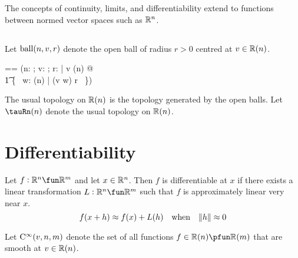 \documentclass[11pt, oneside]{article}
\begin{document}
The concepts of continuity, limits, and differentiability extend to functions between normed vector spaces such as $\mathbb{R}^n$.

\subsection{}

Let $\operatorname{ball}(n,v,r)$ denote the open ball of radius $r > 0$ centred at $v \in \mathbb{R}(n)$.

\begin{zed}
	\ballRn == (\lambda n: \nat; v: \Rinf; r: \Rpos | v \in \R(n) @ \\
	\t1	\{~ w: \Rtuples(n) | \normR(v \vsubR w) \ltR r ~\})
\end{zed}

The usual topology on $\mathbb{R}(n)$ is the topology generated by the open balls.
Let $\tauRn(n)$ denote the usual topology on $\mathbb{R}(n)$.

\section{Differentiability}

Let $f: \R^n \fun \R^m$ and let $x \in \mathbb{R}^n$.
Then $f$ is differentiable at $x$ if there exists a linear transformation $L: \R^n \fun \R^m$
such that $f$ is approximately linear very near $x$.
$$
f(x + h) \approx f(x) + L(h) \quad \text{when} \quad \norm{h} \approx 0
$$ 

Let $\operatorname{C^{\infty}}(v,n,m)$ denote the set of all functions $f \in \Rtuples(n) \pfun \Rtuples(m)$ that are smooth at $v \in \mathbb{R}(n)$.

\printbibliography
\end{document}

